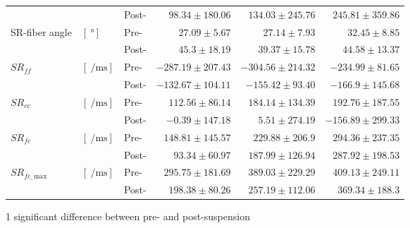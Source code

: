 \begin{landscape}
\begin{table}[!h]
\begin{center}
\begin{threeparttable}
\begin{tabular}{@{}lllrrr@{}}
                                                 &  														 			& Post- & $98.34   \pm 180.06$ & $134.03  \pm 245.76$  & $245.81 \pm 359.86$  \\ [6pt]
\multirow{2}{*}{SR-fiber angle\tnote{1}}         & \multirow{2}{*}{$\left[\SI{}{\degree}\right]$}	 			 	& Pre-  & $27.09   \pm 5.67$   & $27.14   \pm 7.93$    & $32.45 \pm 8.85$     \\
                                                 & 														 			& Post- & $45.3    \pm 18.19$  & $39.37   \pm 15.78$   & $44.58 \pm 13.37$    \\ [6pt]
\multirow{2}{*}{$SR_{ff}$}                       & \multirow{2}{*}{$\left[ \SI{}{\per\milli\second}\right]$}	 		& Pre-  & $-287.19 \pm 207.43$ & $-304.56 \pm 214.32$  & $-234.99 \pm 81.65$  \\
                                                 &  													     			& Post- & $-132.67 \pm 104.11$ & $-155.42 \pm 93.40$   & $-166.9 \pm 145.68$  \\ [6pt]
\multirow{2}{*}{$SR_{cc}$}                       & \multirow{2}{*}{$\left[ \SI{}{\per\milli\second}\right]$} 		& Pre-  & $112.56  \pm 86.14$  & $184.14  \pm 134.39$  & $192.76 \pm 187.55$  \\
                                                 &  														 			& Post- & $-0.39   \pm 147.18$ & $5.51    \pm 274.19$  & $-156.89 \pm 299.33$ \\ [6pt]
\multirow{2}{*}{$SR_{fc}$\tnote{2,5}}            & \multirow{2}{*}{$\left[ \SI{}{\per\milli\second}\right]$} 		& Pre-  & $148.81  \pm 145.57$ & $229.88  \pm 206.9$   & $294.36 \pm 237.35$  \\
                                                 &  														 			& Post- & $93.34   \pm 60.97$  & $187.99  \pm 126.94$  & $287.92 \pm 198.53$  \\ [6pt]
\multirow{2}{*}{$SR_{fc\_\,\mathrm{max}}$\tnote{2,5}}   & \multirow{2}{*}{$\left[ \SI{}{\per\milli\second}\right]$} & Pre-  & $295.75  \pm 181.69$ & $389.03  \pm 229.29$  & $409.13 \pm 249.11$  \\
                                                 &  														 			& Post- & $198.38  \pm 80.26$  & $257.19  \pm 112.06$  & $369.34 \pm 188.3$   \\ \midrule[0.3pt]\bottomrule[1pt]
\end{tabular}
\begin{tablenotes}[flushleft]\footnotesize
\item[1] significant difference between pre- and post-suspension

\end{tablenotes}
\end{threeparttable}
\end{center}
\end{table}
\end{landscape}
